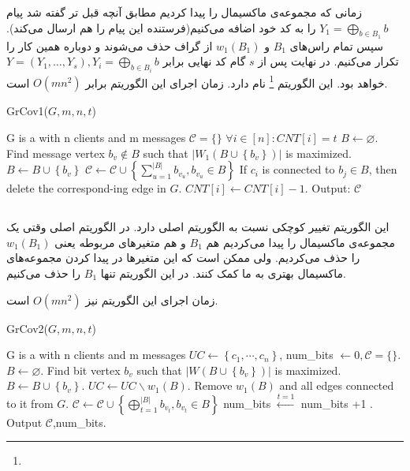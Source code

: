زمانی که مجموعه‌ی ماکسیمال را پیدا کردیم مطابق آنچه قبل تر گفته شد پیام
 $Y_1 = \bigoplus\limits_{b \in B_1} b$
 را به کد خود اضافه می‌کنیم(فرستنده این پیام را هم ارسال می‌کند). سپس تمام راس‌های
 $B_1$
 و
 $w_1(B_1)$
 از گراف حذف می‌شوند و دوباره همین کار را تکرار می‌کنیم. در نهایت پس از 
 $s$
 گام کد نهایی برابر
 $Y = (Y_1, \ldots, Y_s), Y_i =  \bigoplus\limits_{b \in B_i} b$
 خواهد بود. این الگوریتم
 \GRCOVone\footnote{}
 	نام دارد. زمان اجرای این الگوریتم برابر
 	$O(mn^2)$
 	است.
 	\begin{algorithm}[H]
 		\caption{GrCov1($G,m,n,t$) \cite{pliable2015paper}}
 		\label{algorithm:grcov1}
 		\begin{algorithmic}[1]
 			\State G is a \picodt with n clients and m messages
 			\State $\mathcal{C} = \{\}$
 			\State $\forall i \in [n]: CNT[i] = t$ 
		 			\State $B \leftarrow \varnothing$.
				 			\State Find message vertex $b_v \notin B$ such that $\left|W_1\left(B \cup\left\{b_v\right\}\right)\right|$ is maximized.
				 			\State $B \leftarrow B \cup\left\{b_v\right\}$
		 			\EndWhile
		 			\State $\mathcal{C} \leftarrow \mathcal{C} \cup\left\{\sum_{u=1}^{|B|} b_{v_u}, b_{v_u} \in B\right\}$
		 			\State If $c_i$ is connected to $b_j \in B$, then delete the correspond-ing edge in $G$.
		 			\State $CNT[i] \leftarrow CNT[i]-1$.
		 			\EndFor
 			\EndWhile
 			\State Output: $\mathcal{C}$
 		\end{algorithmic}
 	\end{algorithm}
 \subsection{
 }
 این الگوریتم تغییر کوچکی نسبت به الگوریتم اصلی دارد. در الگوریتم اصلی وقتی یک مجموعه‌ی ماکسیمال را پیدا می‌کردیم هم
 $B_1$
 و هم متغیرهای مربوطه یعنی
 $w_1(B_1)$
 را حذف می‌کردیم. ولی ممکن است که این متغیرها در پیدا کردن مجموعه‌های ماکسیمال بهتری به ما کمک کنند. در این الگوریتم تنها
 $B_1$
 را حذف می‌کنیم.
 
 زمان اجرای این الگوریتم نیز
 $O(mn^2)$
 است.
 	\begin{algorithm}[H]
 	\caption{GrCov2($G,m,n,t$) \cite{pliablefirstpaper}}
 	\label{algorithm:grcov2}
 	\begin{algorithmic}[1]
 		\State G is a \picodt with n clients and m messages
 		\State  $U C \leftarrow\left\{c_1, \cdots, c_n\right\}$,
 		\State  num\_bits $\leftarrow 0, \mathcal{C}=\{\}$.
		 		\State $B \leftarrow \varnothing$.
				 		\State  Find bit vertex $b_v$ such that $\left|W\left(B \cup\left\{b_v\right\}\right)\right|$ is maximized.
				 		\State  $B \leftarrow B \cup\left\{b_v\right\}$.
		 		\EndWhile
		 		\State  $UC \leftarrow UC \backslash w_1(B)$.
		 		\State Remove $w_1(B)$ and all edges connected to it from $G$.
		 		\State  $\mathcal{C} \leftarrow \mathcal{C} \cup\left\{\bigoplus_{t=1}^{|B|} b_{v_t}, b_{v_t} \in B\right\}$
		 		\State  num\_bits $\stackrel{t=1}{\leftarrow}$ num\_bits +1 .
 		\EndWhile
 		\State  Output $\mathcal{C}$,num\_bits.
 	\end{algorithmic}
 \end{algorithm} 
